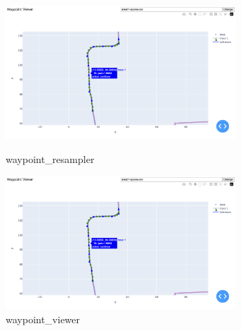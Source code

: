 \begin{figure}[bhtp]
    \centering
    \begin{minipage}[b]{0.45\hsize}
       \centering
       \includegraphics[height=5cm]{fig/waypoint_viewer.png}
       \caption{waypoint\_resampler}
       \label{fig:robot}
    \end{minipage}
    \begin{minipage}[b]{0.45\hsize}
       \centering
       \includegraphics[height=5cm]{fig/waypoint_viewer.png}
       \caption{waypoint\_viewer}
       \label{fig:decomposition}
    \end{minipage}
\end{figure}